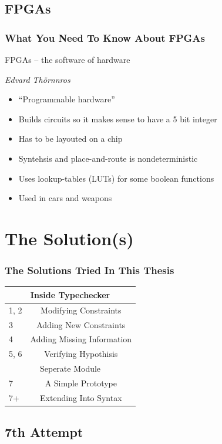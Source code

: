 \documentclass{beamer}
\newcommand{\say}[1]{``#1''}
\begin{document}
\subsection{FPGAs}
\begin{frame}
\frametitle{What You Need To Know About FPGAs}


\epigraph{FPGAs -- the software of hardware}{\textit{Edvard Thörnnros}}

\begin{itemize}
  \item \say{Programmable hardware}
  \item Builds circuits so it makes sense to have a 5 bit integer
  \item Has to be layouted on a chip
  \item Syntehsis and place-and-route is nondeterministic
  \item Uses lookup-tables (LUTs) for some boolean functions
  \item Used in cars and weapons 
\end{itemize}
\end{frame}



\section{The Solution(s)}

\begin{frame}
\frametitle{The Solutions Tried In This Thesis}

\centering
\begin{tabular}{l c}
 \multicolumn{2}{c}{Inside Typechecker} \\
 \hline
 1, 2 & Modifying Constraints \\
 3 & Adding New Constraints \\
 4 & Adding Missing Information \\
 5, 6 & Verifying Hypothisis \\[2em]

 \multicolumn{2}{c}{Seperate Module} \\
 \hline
 7 & A Simple Prototype \\
 7+ & Extending Into Syntax \\
\end{tabular}
\end{frame}

\subsection{7th Attempt}
\end{document}
